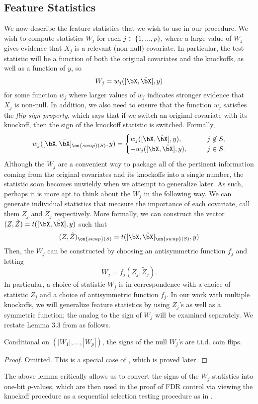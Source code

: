 \documentclass[11pt,reqno]{report}
\theoremstyle{definition}
\numberwithin{equation}{section}
\begin{document}
\subsection{Feature Statistics}
We now describe the feature statistics that we wish to use in our procedure. We wish to compute statistics $W_j$ for each $j \in \{ 1, \ldots, p \}$, where a large value of $W_j$ gives evidence that $X_j$ is a relevant (non-null) covariate. In particular, the test statistic will be a function of both the original covariates and the knockoffs, as well as a function of $y$, so
\[ W_j = w_j([\bX, \tilde{\bX}], y) \] for some function $w_j$ where larger values of $w_j$ indicates stronger evidence that $X_j$ is non-null. In addition, we also need to ensure that the function $w_j$ satisfies the \emph{flip-sign property}, which says that if we switch an original covariate with its knockoff, then the sign of the knockoff statistic is switched. Formally,
\[ w_j([\bX, \tilde{\bX}]_{\on{swap}(S)}, y) = \begin{cases}
w_j([\bX, \tilde{\bX}], y), \qquad & j \not \in S, \\
-w_j([\bX, \tilde{\bX}], y), \qquad & j \in S.
\end{cases}\]
Although the $W_j$ are a convenient way to package all of the pertinent information coming from the original covariates and its knockoffs into a single number, the statistic soon becomes unwieldy when we attempt to generalize later. As such, perhaps it is more apt to think about the $W_j$ in the following way. We can generate individual statistics that measure the importance of each covariate, call them $Z_j$ and $\tilde{Z}_j$ respectively. More formally, we can construct the vector $(Z, \tilde{Z}) = t([\bX, \tilde{\bX}], y)$ such that
\[ (Z, \tilde{Z})_{\on{swap}(S)} = t([\bX, \tilde{\bX}]_{\on{swap}(S)}, y) \] Then, the $W_j$ can be constructed by choosing an antisymmetric function $f_j$ and letting
\[ W_j = f_j(Z_j, \tilde{Z}_j). \] In particular, a choice of statistic $W_j$ is in correspondence with a choice of statistic $Z_j$ and a choice of antisymmetric function $f_j$. In our work with multiple knockoffs, we will generalize feature statistics by using $Z_j$'s as well as a symmetric function; the analog to the sign of $W_j$ will be examined separately. We restate Lemma 3.3 from \cite{panning}
 as follows.
\begin{lem}
Conditional on $(|W_1|, \ldots, |W_p|)$, the signs of the null $W_j$'s are i.i.d. coin flips. 
\end{lem}
\begin{proof}
Omitted. This is a special case of , which is proved later.
\end{proof}
The above lemma critically allows us to convert the signs of the $W_j$ statistics into one-bit $p$-values, which are then used in the proof of FDR control via viewing the knockoff procedure as a sequential selection testing procedure as in \cite{knockoffs}. 
\end{document}
